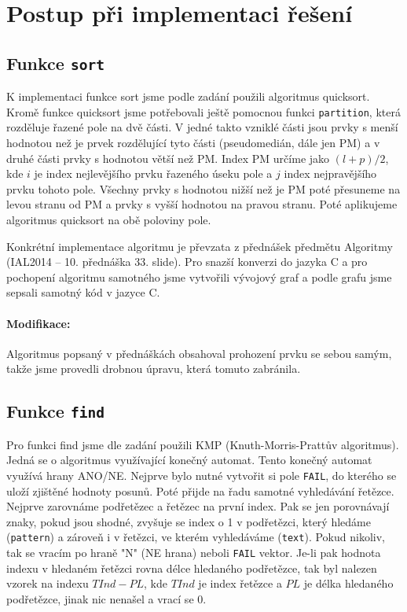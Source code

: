 \documentclass[12pt,a4paper,titlepage,final]{article}
\begin{document}
\section{Postup při implementaci řešení} \label{postup_pri_implementaci_reseni}
\subsection{Funkce \texttt{sort}}
K implementaci funkce sort jsme podle zadání použili algoritmus quicksort.
Kromě funkce quicksort jsme potřebovali ještě pomocnou funkci \verb|partition|,
která rozděluje řazené pole na dvě části. V jedné takto vzniklé části jsou prvky
s menší hodnotou než je prvek rozdělující tyto části (pseudomedián, dále jen PM)
a v druhé části prvky s hodnotou větší než PM. Index PM určíme jako $(l+p)/2$, kde
$i$ je index nejlevějšího prvku řazeného úseku pole a $j$ index nejpravějšího prvku
tohoto pole. Všechny prvky s hodnotou nižší než je PM poté přesuneme na levou
stranu od PM a prvky s vyšší hodnotou na pravou stranu. Poté aplikujeme algoritmus
quicksort na obě poloviny pole.

Konkrétní implementace algoritmu je převzata z přednášek předmětu Algoritmy
(IAL2014 \cite{honzik2} -- 10. přednáška 33. slide). Pro snazší konverzi do jazyka
C a pro pochopení algoritmu samotného jsme vytvořili vývojový graf a podle grafu
jsme sepsali samotný kód v jazyce C.

\paragraph{Modifikace:} Algoritmus popsaný v přednáškách obsahoval prohození
prvku se sebou samým, takže jsme provedli drobnou úpravu, která tomuto zabránila.

\subsection{Funkce \texttt{find}}
Pro funkci find jsme dle zadání použili KMP (Knuth-Morris-Prattův algoritmus).
Jedná se o algoritmus využívající konečný automat. Tento konečný automat využívá
hrany ANO/NE. Nejprve bylo nutné vytvořit si pole \verb|FAIL|, do kterého se
uloží zjištěné hodnoty posunů. Poté přijde na řadu samotné vyhledávání řetězce.
Nejprve zarovnáme podřetězec a řetězec na první index. Pak se jen porovnávají znaky,
pokud jsou shodné, zvyšuje se index o 1 v podřetězci, který hledáme (\verb|pattern|)
a zároveň i v řetězci, ve kterém vyhledáváme (\verb|text|). Pokud nikoliv, tak se
vracím po hraně "N" (NE hrana) neboli \verb|FAIL| vektor. Je-li pak hodnota indexu
v hledaném řetězci rovna délce hledaného podřetězce, tak byl nalezen vzorek na
indexu $TInd - PL$, kde $TInd$ je index řetězce a $PL$ je délka hledaného podřetězce,
jinak nic nenašel a vrací se 0.
\end{document}
